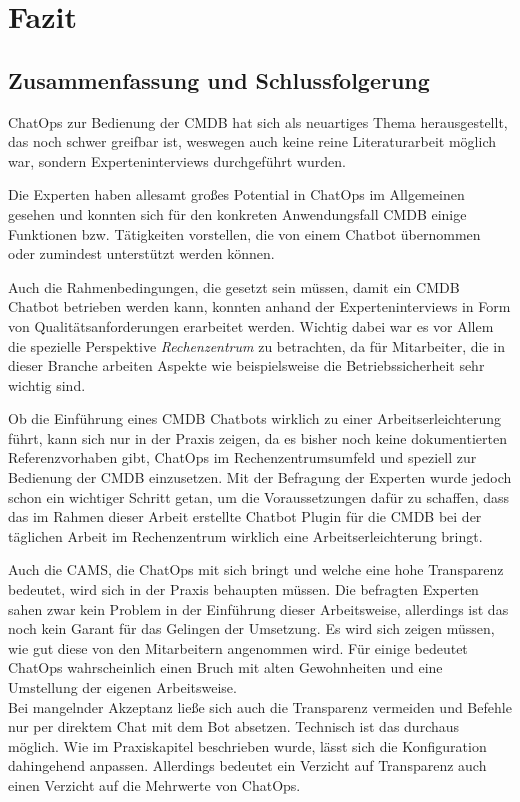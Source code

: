 \chapter{Fazit} \label{Fazit}

\section{Zusammenfassung und Schlussfolgerung}
ChatOps zur Bedienung der \acs{CMDB} hat sich als neuartiges Thema herausgestellt, das noch schwer greifbar ist, weswegen auch keine reine Literaturarbeit möglich war, sondern Experteninterviews durchgeführt wurden.

Die Experten haben allesamt großes Potential in ChatOps im Allgemeinen gesehen und konnten sich für den konkreten Anwendungsfall \acs{CMDB} einige Funktionen bzw. Tätigkeiten  vorstellen, die von einem Chatbot übernommen oder zumindest unterstützt werden können.

Auch die Rahmenbedingungen, die gesetzt sein müssen, damit ein \acs{CMDB} Chatbot betrieben werden kann, konnten anhand der Experteninterviews in Form von Qualitätsanforderungen erarbeitet werden. Wichtig dabei war es vor Allem die spezielle Perspektive \textit{Rechenzentrum} zu betrachten, da für Mitarbeiter, die in dieser Branche arbeiten Aspekte wie beispielsweise die Betriebssicherheit sehr wichtig sind. %

Ob die Einführung eines \acs{CMDB} Chatbots wirklich zu einer Arbeitserleichterung führt, kann sich nur in der Praxis zeigen, da es bisher noch keine dokumentierten Referenzvorhaben gibt, ChatOps im Rechenzentrumsumfeld und speziell zur Bedienung der \acs{CMDB} einzusetzen. Mit der Befragung der Experten wurde jedoch schon ein wichtiger Schritt getan, um die Voraussetzungen dafür zu schaffen, dass das im Rahmen dieser Arbeit erstellte Chatbot Plugin für die \acs{CMDB} bei der täglichen Arbeit im Rechenzentrum wirklich eine Arbeitserleichterung bringt.

Auch die \acl{CAMS}, die ChatOps mit sich bringt und welche eine hohe Transparenz bedeutet, wird sich in der Praxis behaupten müssen. Die befragten Experten sahen zwar kein Problem in der Einführung dieser Arbeitsweise, allerdings ist das noch kein Garant für das Gelingen der Umsetzung. Es wird sich zeigen müssen, wie gut diese von den Mitarbeitern angenommen wird. Für einige bedeutet ChatOps wahrscheinlich einen Bruch mit alten Gewohnheiten und eine Umstellung der eigenen Arbeitsweise.\\
Bei mangelnder Akzeptanz ließe sich auch die Transparenz vermeiden und Befehle nur per direktem Chat mit dem Bot absetzen. Technisch ist das durchaus möglich. Wie im Praxiskapitel beschrieben wurde, lässt sich die Konfiguration dahingehend anpassen. Allerdings bedeutet ein Verzicht auf Transparenz auch einen Verzicht auf die Mehrwerte von ChatOps.

